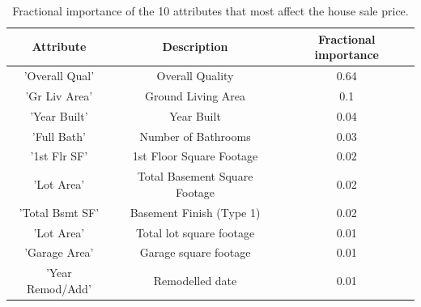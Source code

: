 \documentclass[10pt]{article}
\begin{document}
\begin{table}
\center
\caption{Fractional importance of the 10 attributes that most affect the house sale price.}
\begin{tabular}{ccc}
\hline
Attribute & Description & Fractional importance \\
\hline 
\hline
'Overall Qual' & Overall Quality & 0.64 \\
'Gr Liv Area' & Ground Living Area & 0.1 \\
'Year Built' & Year Built & 0.04 \\
'Full Bath' & Number of Bathrooms & 0.03 \\
'1st Flr SF' & 1st Floor Square Footage & 0.02 \\
'Lot Area' & Total Basement Square Footage & 0.02 \\
'Total Bsmt SF' & Basement Finish (Type 1) & 0.02 \\
'Lot Area' & Total lot square footage & 0.01 \\
'Garage Area' & Garage square footage & 0.01 \\
'Year Remod/Add' & Remodelled date & 0.01 \\
\hline
\end{tabular}
\label{tab_import}
\end{table}
\end{document}
